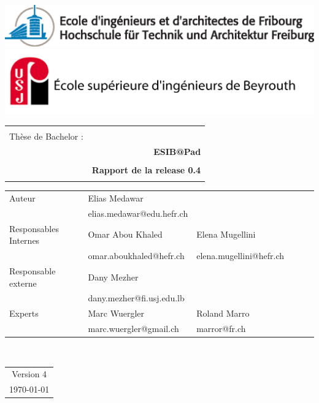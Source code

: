 \begin{titlepage}
\setlength\topmargin{0in}
\setlength\headheight{-0.3in}
\begin{center}

\includegraphics[width=1\textwidth]{../comon/logos/EIA_couleur.eps}  \\

\includegraphics[width=1\textwidth]{../comon/logos/esib_nom.jpg}  \\[0.5cm] 
\end{center}

\begin{tabular}{p{9cm} r}
\hline \\[1cm]
{ \huge {Thèse de Bachelor : } } &  \\
&  \huge \bfseries  ESIB@Pad  \\[1cm]
\hline \\[0.3cm]
 & \Large \bfseries Rapport de la  release 0.4\\
 & \Large \bfseries  \\[1cm]
\end{tabular}

\begin{tabular}{l l l l l l}
Auteur & Elias Medawar & \\[0.1cm]
& elias.medawar@edu.hefr.ch & \\[0.5cm]
Responsables Internes  & Omar Abou Khaled & Elena Mugellini  \\[0.1cm]
&omar.aboukhaled@hefr.ch  & elena.mugellini@hefr.ch \\[0.5cm]	
Responsable externe & Dany Mezher & \\[0.1cm]
&dany.mezher@fi.usj.edu.lb   & \\[0.5cm]
Experts & Marc Wuergler  & Roland Marro   \\[.1cm]
&marc.wuergler@gmail.ch & marror@fr.ch \\[1.5cm]	
\end{tabular}
\\
\begin{center}
\begin{tabular}{c}
Version  4 \\[0.5cm]
 {\today} \\[0.5cm]
\end{tabular}
 \end{center}
\end{titlepage}
